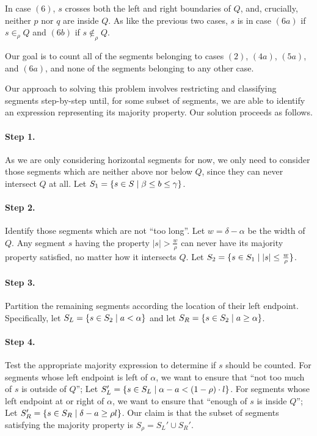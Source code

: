 In case $(6)$, $s$ crosses both the left and right boundaries of $Q$, and, crucially, neither $p$ nor $q$ are inside $Q$. As like the previous two cases, $s$ is in case $(6a)$ if $s \in_\rho Q$ and $(6b)$ if $s \not \in_\rho Q$.

Our goal is to count all of the segments belonging to cases $(2)$, $(4a)$, $(5a)$, and $(6a)$, and none of the segments belonging to any other case.

Our approach to solving this problem involves restricting and classifying segments step-by-step until, for some subset of segments, we are able to identify an expression representing its majority property.  Our solution proceeds as follows.

\paragraph{Step 1.} As we are only considering horizontal segments for now, we only need to consider those segments which are neither above nor below $Q$, since they can never intersect $Q$ at all. Let $S_1 = \{ s \in S \;|\; \beta \leq b \leq \gamma\}$. 

\paragraph{Step 2.} Identify those segments which are not ``too long''.  Let $w = \delta - \alpha$ be the width of $Q$.  Any segment $s$ having the property $|s| > \frac{w}{\rho}$ can never have its majority property satisfied, no matter how it intersects $Q$.  Let $S_2 = \{ s \in S_1 \;|\; |s| \leq \frac{w}{\rho} \}$.

\paragraph{Step 3.} Partition the remaining segments according the location of their left endpoint.  Specifically, let $S_L = \{s \in S_2 \;|\; a < \alpha \}$ and let $S_R = \{ s \in S_2 \;|\; a \geq \alpha \}$.

\paragraph{Step 4.} Test the appropriate majority expression to determine if $s$ should be counted. For segments whose left endpoint is left of $\alpha$, we want to ensure that ``not too much of $s$ is outside of $Q$''; Let $S_L' = \{ s \in S_L \;|\; \alpha - a < (1 - \rho) \cdot l\}$. For segments whose left endpoint at or right of $\alpha$, we want to ensure that ``enough of $s$ is inside $Q$''; Let $S_R' = \{ s \in S_R \;|\; \delta - a \geq  \rho l \}$. Our claim is that the subset of segments satisfying the majority property is $S_\rho = S_L' \cup S_R'$. 

